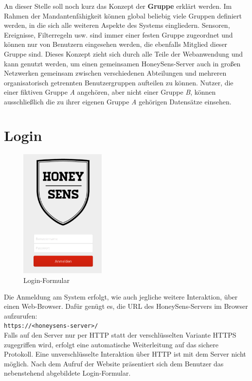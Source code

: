 \documentclass[12pt]{article}
\begin{document}
An dieser Stelle soll noch kurz das Konzept der \textbf{Gruppe} erklärt werden. Im Rahmen der Mandantenfähigkeit können global beliebig viele Gruppen definiert werden, in die sich alle weiteren Aspekte des Systems eingliedern. Sensoren, Ereignisse, Filterregeln usw. sind immer einer festen Gruppe zugeordnet und können nur von Benutzern eingesehen werden, die ebenfalls Mitglied dieser Gruppe sind. Dieses Konzept zieht sich durch alle Teile der Webanwendung und kann genutzt werden, um einen gemeinsamen HoneySens-Server auch in großen Netzwerken gemeinsam zwischen verschiedenen Abteilungen und mehreren organisatorisch getrennten Benutzergruppen aufteilen zu können. Nutzer, die einer fiktiven Gruppe \textit{A} angehören, aber nicht einer Gruppe \textit{B}, können ausschließlich die zu ihrer eigenen Gruppe \textit{A} gehörigen Datensätze einsehen.

\section{Login} \label{login}

\begin{figure}
				\vspace{-15pt}
				\centering
				\includegraphics[width=0.38\textwidth]{./graphics/login.png}
				\caption{Login-Formular}
				\label{fig:login}
\end{figure}


Die Anmeldung am System erfolgt, wie auch jegliche weitere Interaktion, über einen Web-Browser. Dafür genügt es, die URL des HoneySens-Servers im Browser aufzurufen:\\
\verb|https://<honeysens-server>/|\\
Falls auf den Server nur per HTTP statt der verschlüsselten Variante HTTPS zugegriffen wird, erfolgt eine automatische Weiterleitung auf das sichere Protokoll. Eine unverschlüsselte Interaktion über HTTP ist mit dem Server nicht möglich. Nach dem Aufruf der Website präsentiert sich dem Benutzer das nebenstehend  abgebildete Login-Formular.
\end{document}
